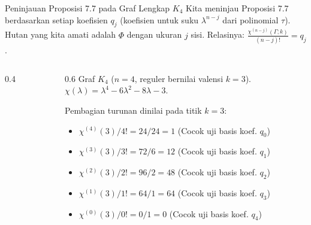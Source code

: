 ﻿\documentclass[aspectratio=169]{beamer}
\begin{document}
\begin{frame}[fragile]{Peninjauan Proposisi 7.7 pada Graf Lengkap $K_4$}
  Kita meninjau Proposisi 7.7 berdasarkan setiap koefisien $q_j$ (koefisien untuk suku $\lambda^{n-j}$ dari polinomial $\tau$). Hutan yang kita amati adalah $\Phi$ dengan ukuran $j$ sisi.
  Relasinya: $\frac{\chi^{(n-j)}(\Gamma; k)}{(n-j)!} = q_j$.

  \begin{columns}[T]
    \begin{column}{0.4\textwidth}
      \begin{center}
        \vspace{0.3cm}
      \end{center}
    \end{column}
    \begin{column}{0.6\textwidth}
      Graf $K_4$ ($n=4$, reguler bernilai valensi $k=3$).\\
      $\chi(\lambda) = \lambda^4 - 6\lambda^2 - 8\lambda - 3$.

      Pembagian turunan dinilai pada titik $k=3$:
      \begin{itemize}
        \item $\chi^{(4)}(3) / 4! = 24 / 24 = 1$ (Cocok uji basis koef. $q_0$)
        \item $\chi^{(3)}(3) / 3! = 72 / 6 = 12$ (Cocok uji basis koef. $q_1$)
        \item $\chi^{(2)}(3) / 2! = 96 / 2 = 48$ (Cocok uji basis koef. $q_2$)
        \item $\chi^{(1)}(3) / 1! = 64 / 1 = 64$ (Cocok uji basis koef. $q_3$)
        \item $\chi^{(0)}(3) / 0! = 0 / 1 = 0$ (Cocok uji basis koef. $q_4$)
      \end{itemize}
    \end{column}
  \end{columns}
\end{frame}
\end{document}
